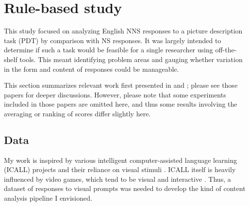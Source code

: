 
\section{Rule-based study}
\label{sec:pilot-study}
This study focused on analyzing English NNS responses to a picture description task (PDT) by comparison with NS responses. It was largely intended to determine if such a task would be feasible for a single researcher using off-the-shelf tools. This meant identifying problem areas and gauging whether variation in the form and content of responses could be manageable.

This section summarizes relevant work first presented in \citet{king:dickinson:13} and \citet{king:dickinson:14}; please see those papers for deeper discussions. However, please note that some experiments included in those papers are omitted here, and thus some results involving the averaging or ranking of scores differ slightly here.

\subsection{Data}
\label{sec:pilot-data}
My work is inspired by various intelligent computer-assisted language learning (ICALL) projects and their reliance on visual stimuli \citep{nagata:02, granstrom2004, yamazaki2014}. ICALL itself is heavily influenced by video games, which tend to be visual and interactive \citep{collentine2011}. Thus, a dataset of responses to visual prompts was needed to develop the kind of content analysis pipeline I envisioned.

